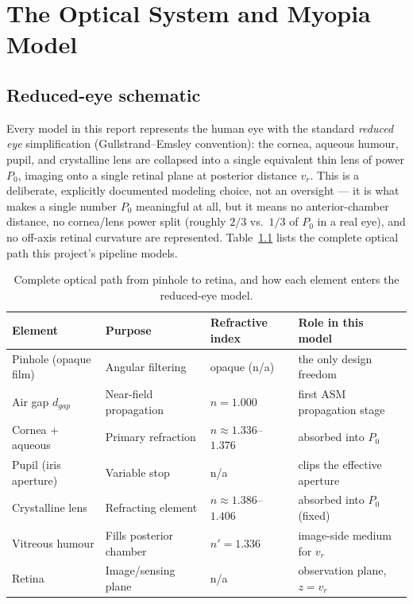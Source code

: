 \chapter{The Optical System and Myopia Model}
\label{ch:optical_system}

\section{Reduced-eye schematic}

Every model in this report represents the human eye with the standard \emph{reduced
eye} simplification (Gullstrand--Emsley convention): the cornea, aqueous humour,
pupil, and crystalline lens are collapsed into a single equivalent thin lens of power
$P_0$, imaging onto a single retinal plane at posterior distance $v_r$. This is a
deliberate, explicitly documented modeling choice, not an oversight --- it is what
makes a single number $P_0$ meaningful at all, but it means no anterior-chamber
distance, no cornea/lens power split (roughly $2/3$ vs.\ $1/3$ of $P_0$ in a real eye),
and no off-axis retinal curvature are represented. Table~\ref{tab:optical-path} lists
the complete optical path this project's pipeline models.

\begin{table}[htbp]
\centering
\begin{tabular}{llll}
\toprule
Element & Purpose & Refractive index & Role in this model \\
\midrule
Pinhole (opaque film) & Angular filtering & opaque (n/a) & the only design freedom \\
Air gap $d_{gap}$ & Near-field propagation & $n=1.000$ & first ASM propagation stage \\
Cornea + aqueous & Primary refraction & $n\approx1.336$--$1.376$ & absorbed into $P_0$ \\
Pupil (iris aperture) & Variable stop & n/a & clips the effective aperture \\
Crystalline lens & Refracting element & $n\approx1.386$--$1.406$ & absorbed into $P_0$ (fixed) \\
Vitreous humour & Fills posterior chamber & $n'=1.336$ & image-side medium for $v_r$ \\
Retina & Image/sensing plane & n/a & observation plane, $z=v_r$ \\
\bottomrule
\end{tabular}
\caption{Complete optical path from pinhole to retina, and how each element enters the reduced-eye model.}
\label{tab:optical-path}
\end{table}

